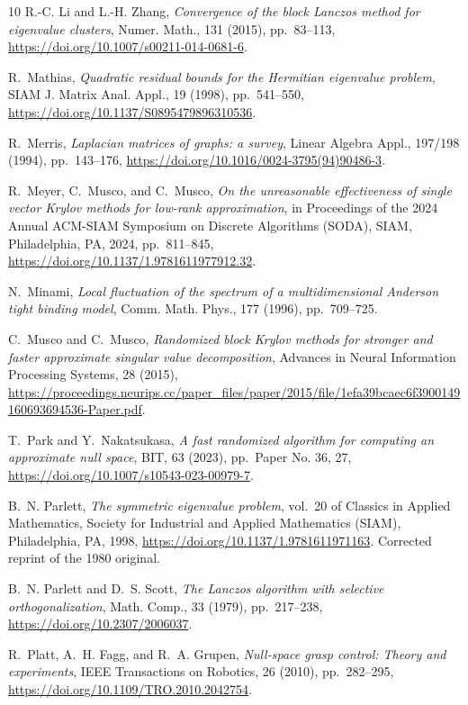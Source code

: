 \documentclass{siamart190516}
\begin{document}
\begin{thebibliography}{10}
{\sc R.-C. Li and L.-H. Zhang}, {\em Convergence of the block {L}anczos method
  for eigenvalue clusters}, Numer. Math., 131 (2015), pp.~83--113,
  \url{https://doi.org/10.1007/s00211-014-0681-6}.

{\sc R.~Mathias}, {\em Quadratic residual bounds for the {H}ermitian eigenvalue
  problem}, SIAM J. Matrix Anal. Appl., 19 (1998), pp.~541--550,
  \url{https://doi.org/10.1137/S0895479896310536}.

{\sc R.~Merris}, {\em Laplacian matrices of graphs: a survey}, Linear Algebra
  Appl., 197/198 (1994), pp.~143--176,
  \url{https://doi.org/10.1016/0024-3795(94)90486-3}.

{\sc R.~Meyer, C.~Musco, and C.~Musco}, {\em On the unreasonable effectiveness
  of single vector {K}rylov methods for low-rank approximation}, in Proceedings
  of the 2024 {A}nnual {ACM}-{SIAM} {S}ymposium on {D}iscrete {A}lgorithms
  ({SODA}), SIAM, Philadelphia, PA, 2024, pp.~811--845,
  \url{https://doi.org/10.1137/1.9781611977912.32}.

{\sc N.~Minami}, {\em Local fluctuation of the spectrum of a multidimensional
  {A}nderson tight binding model}, Comm. Math. Phys., 177 (1996), pp.~709--725.

{\sc C.~Musco and C.~Musco}, {\em Randomized block {Krylov} methods for
  stronger and faster approximate singular value decomposition}, Advances in
  Neural Information Processing Systems, 28 (2015),
  \url{https://proceedings.neurips.cc/paper_files/paper/2015/file/1efa39bcaec6f3900149160693694536-Paper.pdf}.

{\sc T.~Park and Y.~Nakatsukasa}, {\em A fast randomized algorithm for
  computing an approximate null space}, BIT, 63 (2023), pp.~Paper No. 36, 27,
  \url{https://doi.org/10.1007/s10543-023-00979-7}.

{\sc B.~N. Parlett}, {\em The symmetric eigenvalue problem}, vol.~20 of
  Classics in Applied Mathematics, Society for Industrial and Applied
  Mathematics (SIAM), Philadelphia, PA, 1998,
  \url{https://doi.org/10.1137/1.9781611971163}.
\newblock Corrected reprint of the 1980 original.

{\sc B.~N. Parlett and D.~S. Scott}, {\em The {L}anczos algorithm with
  selective orthogonalization}, Math. Comp., 33 (1979), pp.~217--238,
  \url{https://doi.org/10.2307/2006037}.

{\sc R.~Platt, A.~H. Fagg, and R.~A. Grupen}, {\em Null-space grasp control:
  Theory and experiments}, IEEE Transactions on Robotics, 26 (2010),
  pp.~282--295, \url{https://doi.org/10.1109/TRO.2010.2042754}.


\end{thebibliography}
\end{document}
